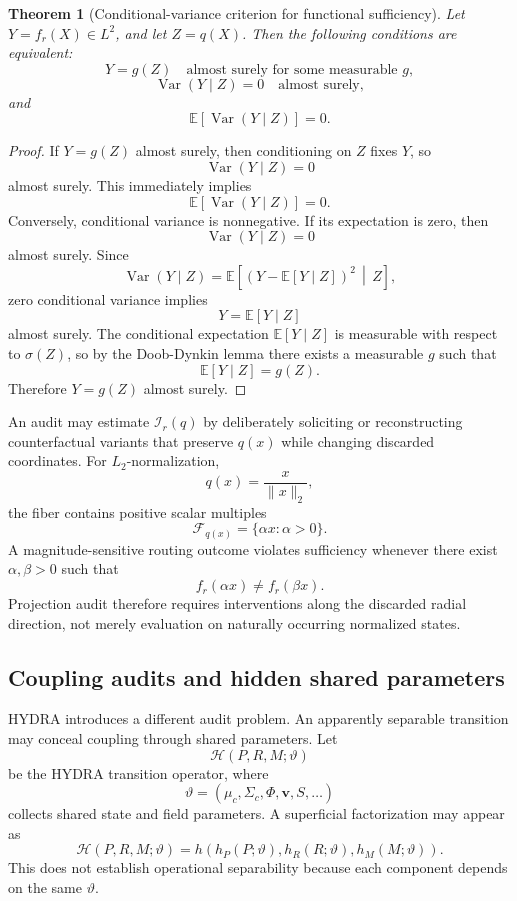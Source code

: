 \documentclass[11pt]{article}
\newtheorem{theorem}[definition]{Theorem}
\theoremstyle{definition}
\DeclareMathOperator{\Var}{Var}
\newcommand{\E}{\mathbb{E}}
\newcommand{\FieldPhi}{\Phi}
\newcommand{\FieldV}{\mathbf{v}}
\newcommand{\FieldS}{S}
\newcommand{\given}{\,\middle|\,}
\begin{document}
\begin{theorem}[Conditional-variance criterion for functional sufficiency]
Let \(Y=f_r(X)\in L^2\), and let \(Z=q(X)\). Then the following conditions are equivalent:
\[
Y=g(Z)
\quad\text{almost surely for some measurable }g,
\]
\[
\Var(Y\mid Z)=0
\quad\text{almost surely},
\]
and
\[
\E[\Var(Y\mid Z)]=0.
\]
\end{theorem}

\begin{proof}
If \(Y=g(Z)\) almost surely, then conditioning on \(Z\) fixes \(Y\), so
\[
\Var(Y\mid Z)=0
\]
almost surely. This immediately implies
\[
\E[\Var(Y\mid Z)]=0.
\]
Conversely, conditional variance is nonnegative. If its expectation is zero, then
\[
\Var(Y\mid Z)=0
\]
almost surely. Since
\[
\Var(Y\mid Z)
=
\E\!\left[
\left(
Y-\E[Y\mid Z]
\right)^2
\given Z
\right],
\]
zero conditional variance implies
\[
Y=\E[Y\mid Z]
\]
almost surely. The conditional expectation \(\E[Y\mid Z]\) is measurable with respect to \(\sigma(Z)\), so by the Doob-Dynkin lemma there exists a measurable \(g\) such that
\[
\E[Y\mid Z]=g(Z).
\]
Therefore \(Y=g(Z)\) almost surely.
\end{proof}

An audit may estimate \(\mathcal{I}_r(q)\) by deliberately soliciting or reconstructing counterfactual variants that preserve \(q(x)\) while changing discarded coordinates. For \(L_2\)-normalization,
\[
q(x)=\frac{x}{\lVert x\rVert_2},
\]
the fiber contains positive scalar multiples
\[
\mathcal{F}_{q(x)}
=
\{\alpha x:\alpha>0\}.
\]
A magnitude-sensitive routing outcome violates sufficiency whenever there exist \(\alpha,\beta>0\) such that
\[
f_r(\alpha x)\neq f_r(\beta x).
\]
Projection audit therefore requires interventions along the discarded radial direction, not merely evaluation on naturally occurring normalized states.

\subsection{Coupling audits and hidden shared parameters}

HYDRA introduces a different audit problem. An apparently separable transition may conceal coupling through shared parameters. Let
\[
\mathcal{H}(P,R,M;\vartheta)
\]
be the HYDRA transition operator, where
\[
\vartheta
=
(\mu_c,\Sigma_c,\FieldPhi,\FieldV,\FieldS,\ldots)
\]
collects shared state and field parameters. A superficial factorization may appear as
\[
\mathcal{H}(P,R,M;\vartheta)
=
h\!\left(
h_P(P;\vartheta),
h_R(R;\vartheta),
h_M(M;\vartheta)
\right).
\]
This does not establish operational separability because each component depends on the same \(\vartheta\).
\end{document}
